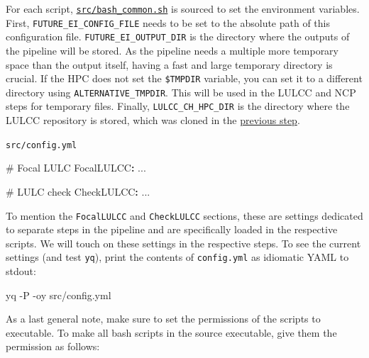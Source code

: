 \documentclass[
  letterpaper,
  DIV=11,
  numbers=noendperiod]{scrreprt}
\newenvironment{Shaded}{\begin{snugshade}}{\end{snugshade}}
\newcommand{\AttributeTok}[1]{\textcolor[rgb]{0.40,0.45,0.13}{#1}}
\newcommand{\CommentTok}[1]{\textcolor[rgb]{0.37,0.37,0.37}{#1}}
\newcommand{\ExtensionTok}[1]{\textcolor[rgb]{0.00,0.23,0.31}{#1}}
\newcommand{\FunctionTok}[1]{\textcolor[rgb]{0.28,0.35,0.67}{#1}}
\newcommand{\KeywordTok}[1]{\textcolor[rgb]{0.00,0.23,0.31}{\textbf{#1}}}
\newcommand{\NormalTok}[1]{\textcolor[rgb]{0.00,0.23,0.31}{#1}}
\begin{document}
For each script,
\href{https://github.com/cbueth/Future-EI/tree/main/src/bash_common.sh}{\texttt{src/bash\_common.sh}}
is sourced to set the environment variables. First,
\texttt{FUTURE\_EI\_CONFIG\_FILE} needs to be set to the absolute path
of this configuration file. \texttt{FUTURE\_EI\_OUTPUT\_DIR} is the
directory where the outputs of the pipeline will be stored. As the
pipeline needs a multiple more temporary space than the output itself,
having a fast and large temporary directory is crucial. If the HPC does
not set the \texttt{\$TMPDIR} variable, you can set it to a different
directory using \texttt{ALTERNATIVE\_TMPDIR}. This will be used in the
LULCC and NCP steps for temporary files. Finally,
\texttt{LULCC\_CH\_HPC\_DIR} is the directory where the LULCC repository
is stored, which was cloned in the \hyperref[lulcc-repository]{previous
step}.

\begin{codelisting}

\caption{\texttt{src/config.yml}}

\begin{Shaded}
\begin{Highlighting}[]
\CommentTok{\# Focal LULC}
\FunctionTok{FocalLULCC}\KeywordTok{:}
\AttributeTok{  ...}

\CommentTok{\# LULC check}
\FunctionTok{CheckLULCC}\KeywordTok{:}
\AttributeTok{  ...}
\end{Highlighting}
\end{Shaded}

\end{codelisting}

To mention the \texttt{FocalLULCC} and \texttt{CheckLULCC} sections,
these are settings dedicated to separate steps in the pipeline and are
specifically loaded in the respective scripts. We will touch on these
settings in the respective steps. To see the current settings (and test
\texttt{yq}), print the contents of \texttt{config.yml} as idiomatic
YAML to stdout:

\begin{Shaded}
\begin{Highlighting}[]
\ExtensionTok{yq} \AttributeTok{{-}P} \AttributeTok{{-}oy}\NormalTok{ src/config.yml}
\end{Highlighting}
\end{Shaded}

As a last general note, make sure to set the permissions of the scripts
to executable. To make all bash scripts in the source executable, give
them the permission as follows:
\end{document}
